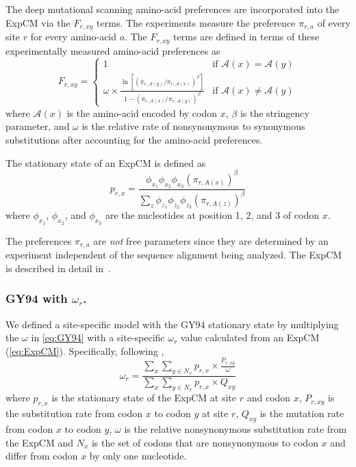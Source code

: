 \documentclass[11pt]{article}
\begin{document}
The deep mutational scanning amino-acid preferences are incorporated into the ExpCM via the $F_{r,xy}$ terms.
The experiments measure the preference $\pi_{r,a}$ of every site $r$ for every amino-acid $a$.
The $F_{r,xy}$ terms are defined in terms of these experimentally measured amino-acid preferences as
\begin{equation}
\label{eq:Frxy}
F_{r,xy} = 
\begin{cases}
   1 & \mbox{if $\mathcal{A}\left(x\right) = \mathcal{A}\left(y\right)$} \\
   \omega \times \frac{\ln\left[\left(\pi_{r,\mathcal{A}\left(y\right)} / \pi_{r,\mathcal{A}\left(x\right)}\right)^{\beta}\right]}{1 - \left(\pi_{r,\mathcal{A}\left(x\right)} / \pi_{r,\mathcal{A}\left(y\right)}\right)^{\beta}} & \mbox{if $\mathcal{A}\left(x\right) \ne \mathcal{A}\left(y\right)$}
   \end{cases}
\end{equation}
where $\mathcal{A}\left(x\right)$ is the amino-acid encoded by codon $x$, $\beta$ is the stringency parameter, and $\omega$ is the relative rate of nonsynonymous to synonymous substitutions after accounting for the amino-acid preferences.

The stationary state of an ExpCM is defined as 
\begin{equation}
\label{eq:prx}
p_{r,x} = \frac{\phi_{x_1}\phi_{x_2}\phi_{x_3}\left(\pi_{r,A\left(x\right)}\right)^\beta}{\sum_z \phi_{z_1}\phi_{z_2}\phi_{z_3}\left(\pi_{r,A\left(z\right)}\right)^\beta}
\end{equation}
where $\phi_{x_1}$, $\phi_{x_2}$, and $\phi_{x_3}$ are the nucleotides at position 1, 2, and 3 of codon $x$. 

The preferences $\pi_{r,a}$ are \emph{not} free parameters since they are determined by an experiment independent of the sequence alignment being analyzed.
The ExpCM is described in detail in~\citet{hilton2017phydms}. 

\subsubsection*{GY94 with $\omega_r$.}

We defined a site-specific model with the GY94 stationary state by multiplying the $\omega$ in \ref{eq:GY94} with a site-specific $\omega_r$ value calculated from an ExpCM (\ref{eq:ExpCM}). 
Specifically, following \citet{spielman2015relationship}, 
\begin{equation}
\label{eq:w_r}
\omega_{r} = \frac{\sum_{x} \sum_{y \in N_x} {p_{r,x} \times \frac{P_{r,xy}}{\omega}}}{\sum_{x} \sum_{y \in N_x} {p_{r,x} \times Q_{xy}}}
\end{equation}
where $p_{r,x}$ is the stationary state of the ExpCM at site $r$ and codon $x$, $P_{r,xy}$ is the substitution rate from codon $x$ to codon $y$ at site $r$, $Q_{xy}$ is the mutation rate from codon $x$ to codon $y$, $\omega$ is the relative nonsynonymous substitution rate from the ExpCM and $N_x$ is the set of codons that are nonsynonymous to codon $x$ and differ from codon $x$ by only one nucleotide. 
\end{document}
